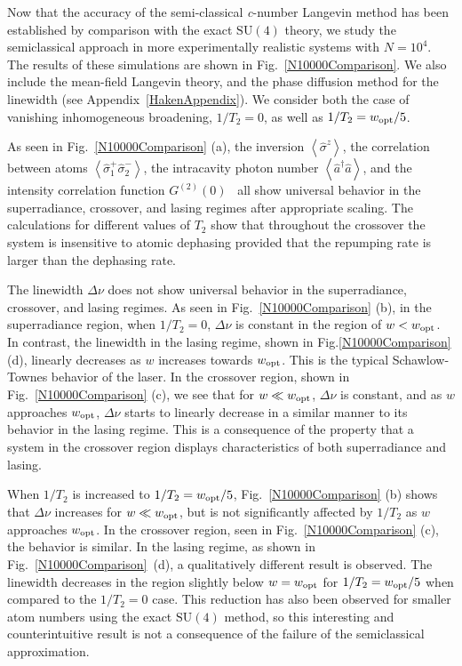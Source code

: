\documentclass[aps,
twocolumn,
showpacs,
superscriptaddress,groupedaddress]{revtex4}
\begin{document}
Now that the accuracy of the semi-classical \textit{c}-number Langevin
method has been established by comparison with the exact $\mathrm{SU}(4)$ theory,
we study the semiclassical approach in more experimentally realistic
systems with $N=10^4$. The results of these simulations are shown in
Fig.~\ref{N10000Comparison}.  We also include the mean-field Langevin
theory, and the phase diffusion method for the linewidth (see
Appendix~\ref{HakenAppendix}). We consider both the case of vanishing
inhomogeneous broadening, $1/T_2=0$, as well as $1/T_2=w_{\rm opt}/5$.

As seen in Fig.~\ref{N10000Comparison} (a), the inversion
$\left<\hat{\sigma}^{z}\right>$, the correlation between atoms
$\left<\hat{\sigma}_{1}^{+} \hat{\sigma}_{2}^{-}\right>$, the
intracavity photon number $\left<\hat{a}^{\dagger}\hat{a}\right>$, and
the intensity correlation function
$G^{(2)}(0)$~\cite{meystre2007elements} all show universal behavior in
the superradiance, crossover, and lasing regimes after appropriate
scaling.  The calculations for different values of $T_2$ show that
throughout the crossover the system is insensitive to atomic dephasing
provided that the repumping rate is larger than the dephasing rate.

The linewidth $\Delta \nu$ does not show universal behavior in the
superradiance, crossover, and lasing regimes. As seen in
Fig.~\ref{N10000Comparison} (b), in the superradiance region, when
$1/T_2=0$, $\Delta \nu$ is constant in the region of $w<w_{\rm opt}$.
In contrast, the linewidth in the lasing regime, shown in
Fig.\ref{N10000Comparison} (d), linearly decreases as $w$ increases
towards $w_{\rm opt}$. This is the typical Schawlow-Townes behavior of
the laser. In the crossover region, shown in
Fig.~\ref{N10000Comparison} (c), we see that for $w\ll w_{\rm opt}$,
$\Delta \nu$ is constant, and as $w$ approaches $w_{\rm opt}$,
$\Delta \nu$ starts to linearly decrease in a similar manner to its
behavior in the lasing regime. This is a consequence of the property
that a system in the crossover region displays characteristics of both
superradiance and lasing.

When $1/T_2$ is increased to $1/T_2=w_{\rm opt}/5$,
Fig.~\ref{N10000Comparison} (b) shows that $\Delta \nu$ increases for
$w\ll w_{\rm opt}$, but is not significantly affected by $1/T_2$ as $w$
approaches $w_{\rm opt}$. In the crossover region, seen in
Fig.~\ref{N10000Comparison} (c), the behavior is similar. In the lasing
regime, as shown in Fig.~\ref{N10000Comparison}~(d), a qualitatively
different result is observed. The linewidth decreases in the region
slightly below $w=w_{\rm opt}$ for $1/T_2=w_{\rm opt}/5$ when compared
to the $1/T_2=0$ case. This reduction has also been observed for smaller
atom numbers using the exact $\mathrm{SU}(4)$ method, so this
interesting and counterintuitive result is not a consequence of the
failure of the semiclassical approximation.
\end{document}
